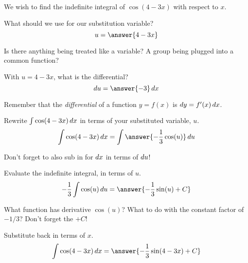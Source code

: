 \documentclass{ximera}
\author{Bobby Ramsey}
\begin{document}
\begin{exercise}
	We wish to find the indefinite integral of $\cos(4-3x)$ with respect to $x$.

	What should we use for our substitution variable?
	\[ u = \answer{4-3x} \]
	\begin{hint}
		Is there anything being treated like a variable?  A group being plugged into a common function?
	\end{hint}
	\begin{exercise}
		With $u = 4-3x$, what is the differential?
		\[ \d u = \answer{-3} \d x \]
		\begin{hint}
			Remember that the \emph{differential} of a function $y = f(x)$ is $\mathop{}\!d y = f'(x) \mathop{}\!d x$.
		\end{hint}
		\begin{exercise}
			Rewrite $\int \cos(4-3x) \mathop{}\!d x$ in terms of your substituted variable, $u$.
			\[ \int \cos(4-3x) \d x = \int \answer{-\frac{1}{3}\cos(u) } \d u \]
			\begin{hint}
				Don't forget to also sub in for $\mathop{}\!d x$ in terms of $\mathop{}\!d u$!
			\end{hint}
			\begin{exercise}
				Evaluate the indefinite integral, in terms of $u$.
				\[ -\frac{1}{3} \int \cos(u) \d u = \answer{-\frac{1}{3}\sin(u) + C} \]
				\begin{hint}
					What function has derivative $\cos(u)$?  What to do with the constant factor of $-1/3$?  Don't forget the $+C$!
				\end{hint}
				\begin{exercise}
					Substitute back in terms of $x$.
					\[ \int \cos(4-3x) \d x = \answer{-\frac{1}{3}\sin(4-3x) + C} \]
				\end{exercise}
			\end{exercise}
	
		\end{exercise}
	\end{exercise}
\end{exercise}
\end{document}
